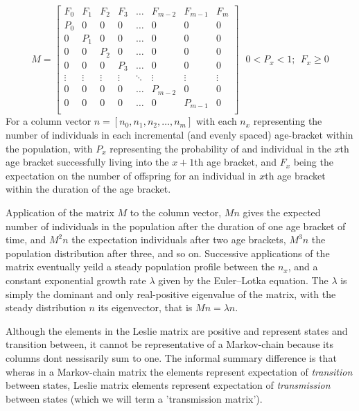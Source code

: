 \documentclass[journal,article,accept,oneauthors,pdftex,10pt,a4paper]{mdpi}
\begin{document}
\begin{equation*}
M=\begin{bmatrix}
    F_0 & F_1 & F_2 & F_3 & \dots  & F_{m-2} & F_{m-1} & F_m  \\
    P_0 &  0  &  0  &  0  & \dots  &    0    &  0    &  0   \\
     0  & P_1 &  0  &  0  & \dots  &    0    &  0    &  0   \\
     0  &  0  & P_2 &  0  & \dots  &    0    &  0    &  0   \\
     0  &  0  &  0  & P_3 & \dots  &    0    &  0    &  0   \\
    \vdots & \vdots & \vdots & \vdots & \ddots & \vdots & \vdots & \vdots \\
     0  &  0  &  0  &  0  & \dots  & P_{m-2} &  0    &  0   \\
     0  &  0  &  0  &  0  & \dots  &    0    & P_{m-1} & 0   \\
\end{bmatrix}
~~~0<P_x<1;~~F_x\ge0
\end{equation*}
For a column vector $n = [n_0,n_1,n_2,\dots,n_m]$ with each $n_x$ representing the number of individuals in each incremental (and evenly spaced) age-bracket within the population, with $P_x$ representing the probability of and individual in the $x$th age bracket successfully living into the $x+1$th age bracket, and $F_x$ being the expectation on the number of offspring for an individual in $x$th age bracket within the duration of the age bracket.

Application of the matrix $M$ to the column vector, $Mn$ gives the expected number of individuals in the population after the duration of one age bracket of time, and $M^2n$ the expectation individuals after two age brackets, $M^3n$ the population distribution after three, and so on.
Successive applications of the matrix eventually yeild a steady population profile between the $n_x$, and a constant exponential growth rate $\lambda$ given by the Euler–Lotka equation.
The $\lambda$ is simply the dominant and only real-positive eigenvalue of the matrix, with the steady distribution $n$ its eigenvector, that is $Mn=\lambda n$.

Although the elements in the Leslie matrix are positive and represent states and transition between, it cannot be representative of a Markov-chain because its columns dont nessisarily sum to one.
The informal summary difference is that wheras in a Markov-chain matrix the elements represent expectation of \textit{transition} between states, Leslie matrix elements represent expectation of \textit{transmission} between states (which we will term a 'transmission matrix').
\end{document}
